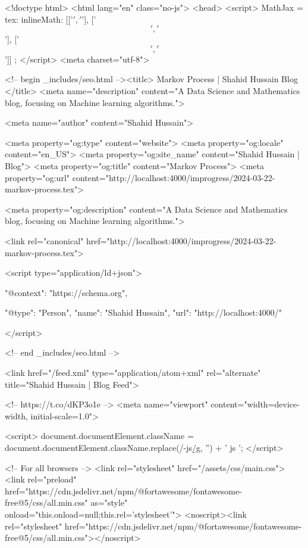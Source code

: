 <!doctype html>
<html lang="en" class="no-js">
  <head>
    <script>
      MathJax = {
        tex: {
          inlineMath: [['$', '$'], ['\[','\]'], ['$$', '$$']]
        }
      };
      </script>
    <meta charset="utf-8">

<!-- begin _includes/seo.html --><title>            Markov Process | Shahid Hussain      Blog      </title>
<meta name="description" content="A Data Science and Mathematics blog, focusing on Machine learning algorithms.">


  <meta name="author" content="Shahid Hussain">
  


<meta property="og:type" content="website">
<meta property="og:locale" content="en_US">
<meta property="og:site_name" content="Shahid Hussain | Blog">
<meta property="og:title" content="Markov Process">
<meta property="og:url" content="http://localhost:4000/improgress/2024-03-22-markov-process.tex">


  <meta property="og:description" content="A Data Science and Mathematics blog, focusing on Machine learning algorithms.">












<link rel="canonical" href="http://localhost:4000/improgress/2024-03-22-markov-process.tex">




<script type="application/ld+json">
  {
    "@context": "https://schema.org",
    
      "@type": "Person",
      "name": "Shahid Hussain",
      "url": "http://localhost:4000/"
    
  }
</script>







<!-- end _includes/seo.html -->



  <link href="/feed.xml" type="application/atom+xml" rel="alternate" title="Shahid Hussain | Blog Feed">


<!-- https://t.co/dKP3o1e -->
<meta name="viewport" content="width=device-width, initial-scale=1.0">

<script>
  document.documentElement.className = document.documentElement.className.replace(/\bno-js\b/g, '') + ' js ';
</script>

<!-- For all browsers -->
<link rel="stylesheet" href="/assets/css/main.css">
<link rel="preload" href="https://cdn.jsdelivr.net/npm/@fortawesome/fontawesome-free@5/css/all.min.css" as="style" onload="this.onload=null;this.rel='stylesheet'">
<noscript><link rel="stylesheet" href="https://cdn.jsdelivr.net/npm/@fortawesome/fontawesome-free@5/css/all.min.css"></noscript>



